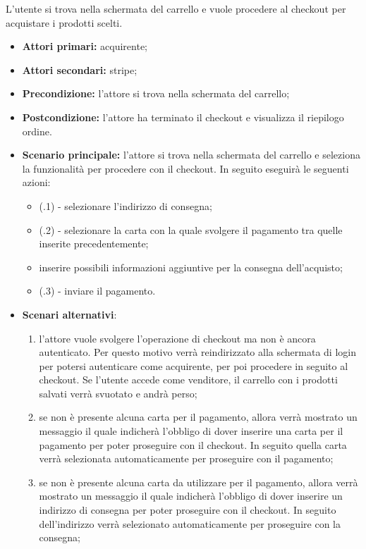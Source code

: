 L'utente si trova nella schermata del carrello e vuole procedere al checkout per acquistare i prodotti scelti.
\begin{itemize}
    \item \textbf{Attori primari:} acquirente;
    \item \textbf{Attori secondari:} stripe;
    \item \textbf{Precondizione:} l'attore si trova nella schermata del carrello;
    \item \textbf{Postcondizione:} l'attore ha terminato il checkout e visualizza il riepilogo ordine.
    \item \textbf{Scenario principale:} l'attore si trova nella schermata del carrello e seleziona la funzionalità per procedere con il checkout. In seguito eseguirà le seguenti azioni:
    \begin{itemize}
    	\item (\actualUC.1) - selezionare l'indirizzo di consegna;
    	\item (\actualUC.2) - selezionare la carta con la quale svolgere il pagamento tra quelle inserite precedentemente;
    	\item inserire possibili informazioni aggiuntive per la consegna dell'acquisto;
        \item (\actualUC.3) - inviare il pagamento.
    \end{itemize} 
    \item \textbf{Scenari alternativi}: 
    \begin{enumerate}[label=\lett]
        \item l'attore vuole svolgere l'operazione di checkout ma non è ancora autenticato. Per questo motivo verrà reindirizzato alla schermata di login per potersi autenticare come acquirente, per poi procedere in seguito al checkout. Se l'utente accede come venditore, il carrello con i prodotti salvati verrà svuotato e andrà perso;
        \item se non è presente alcuna carta per il pagamento, allora verrà mostrato un messaggio il quale indicherà l'obbligo di dover inserire una carta per il pagamento per poter proseguire con il checkout. In seguito quella carta verrà selezionata automaticamente per proseguire con il pagamento;
        \item se non è presente alcuna carta da utilizzare per il pagamento, allora verrà mostrato un messaggio il quale indicherà l'obbligo di dover inserire un indirizzo di consegna per poter proseguire con il checkout. In seguito dell'indirizzo verrà selezionato automaticamente per proseguire con la consegna;
    \end{enumerate}
\end{itemize}

